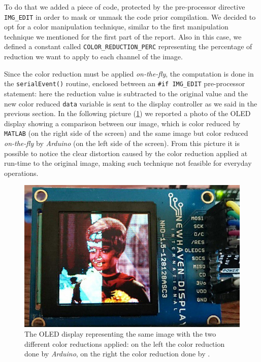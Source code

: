 \documentclass[a4paper]{article}
\begin{document}
            To do that we added a piece of code, protected by the pre-processor directive \texttt{IMG\_EDIT} in order to mask or unmask the code prior compilation.
            We decided to opt for a color manipulation technique, similar to the first manipulation technique we mentioned for the first part of the report. Also in this case, we defined a constant called \texttt{COLOR\_REDUCTION\_PERC} representing the percentage of reduction we want to apply to each channel of the image.

            Since the color reduction must be applied \emph{on-the-fly}, the computation is done in the \texttt{serialEvent()} routine, enclosed between an \texttt{\#if IMG\_EDIT} pre-processor statement: here the reduction value is subtracted to the original value and the new color reduced \texttt{data} variable is sent to the display controller as we said in the previous section. In the following picture (\ref{fig:ColorReductionComparison}) we reported a photo of the OLED display showing a comparison between our image, which is color reduced by \texttt{MATLAB} (on the right side of the screen) and the same image but color reduced \emph{on-the-fly} by \emph{Arduino} (on the left side of the screen).
            From this picture it is possible to notice the clear distortion caused by the color reduction applied at run-time to the original image, making such technique not feasible for everyday operations.

            \begin{figure}[htp]
                \centering
                \includegraphics[width=0.4 \columnwidth]{./screenshots/ColorReductionComparison}
                \caption{
                        \label{fig:ColorReductionComparison}
                        The OLED display representing the same image with the two different color reductions applied: on the left the color reduction done by \emph{Arduino}, on the right the color reduction done by .
                }
            \end{figure}
\end{document}
